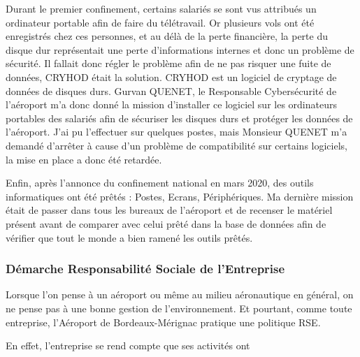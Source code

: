 Durant le premier confinement, certains salariés se sont vus attribués un ordinateur portable afin de faire du télétravail. Or plusieurs vols ont été enregistrés chez ces personnes, et au délà de la perte financière, la perte du disque dur représentait une perte d'informations internes et donc un problème de sécurité.
Il fallait donc régler le problème afin de ne pas risquer une fuite de données, CRYHOD était la solution. CRYHOD est un logiciel de cryptage de données de disques durs.
Gurvan QUENET, le Responsable Cybersécurité de l'aéroport m'a donc donné la mission d'installer ce logiciel sur les ordinateurs portables des salariés afin de sécuriser les disques durs et protéger les données de l'aéroport.
J'ai pu l'effectuer sur quelques postes, mais Monsieur QUENET m'a demandé d'arrêter à cause d'un problème de compatibilité sur certains logiciels, la mise en place a donc été retardée.\newline

Enfin, après l'annonce du confinement national en mars 2020, des outils informatiques ont été prêtés : Postes, Ecrans, Périphériques.
Ma dernière mission était de passer dans tous les bureaux de l'aéroport et de recenser le matériel présent avant de comparer avec celui prêté dans la base de données afin de vérifier que tout le monde a bien ramené les outils prêtés.

\subsubsection*{Démarche Responsabilité Sociale de l’Entreprise}


Lorsque l'on pense à un aéroport ou même au milieu aéronautique en général, on ne pense pas à une bonne gestion de l'environnement.
Et pourtant, comme toute entreprise, l'Aéroport de Bordeaux-Mérignac pratique une politique RSE.


En effet, l'entreprise se rend compte que ses activités ont 